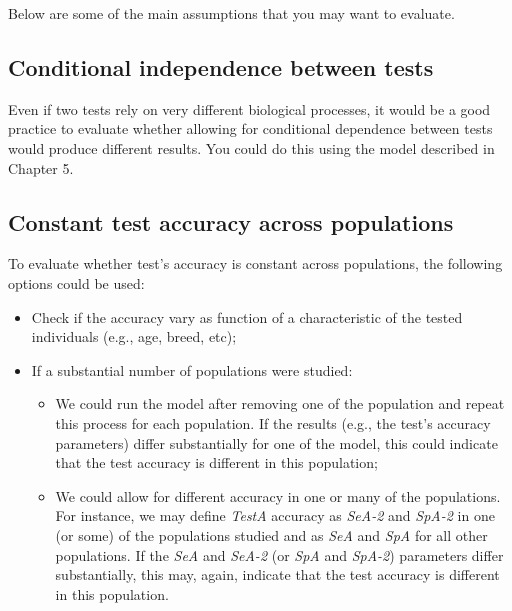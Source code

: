 \documentclass[
]{book}
\providecommand{\tightlist}{%
  \setlength{\itemsep}{0pt}\setlength{\parskip}{0pt}}
\begin{document}
Below are some of the main assumptions that you may want to evaluate.

\subsection{Conditional independence between tests}\label{conditional-independence-between-tests}

Even if two tests rely on very different biological processes, it would be a good practice to evaluate whether allowing for conditional dependence between tests would produce different results. You could do this using the model described in Chapter 5.

\subsection{Constant test accuracy across populations}\label{constant-test-accuracy-across-populations}

To evaluate whether test's accuracy is constant across populations, the following options could be used:

\begin{itemize}
\tightlist
\item
  Check if the accuracy vary as function of a characteristic of the tested individuals (e.g., age, breed, etc);\\
\item
  If a substantial number of populations were studied:

  \begin{itemize}
  \tightlist
  \item
    We could run the model after removing one of the population and repeat this process for each population. If the results (e.g., the test's accuracy parameters) differ substantially for one of the model, this could indicate that the test accuracy is different in this population;\\
  \item
    We could allow for different accuracy in one or many of the populations. For instance, we may define \emph{TestA} accuracy as \emph{SeA-2} and \emph{SpA-2} in one (or some) of the populations studied and as \emph{SeA} and \emph{SpA} for all other populations. If the \emph{SeA} and \emph{SeA-2} (or \emph{SpA} and \emph{SpA-2}) parameters differ substantially, this may, again, indicate that the test accuracy is different in this population.
  \end{itemize}
\end{itemize}
\end{document}
